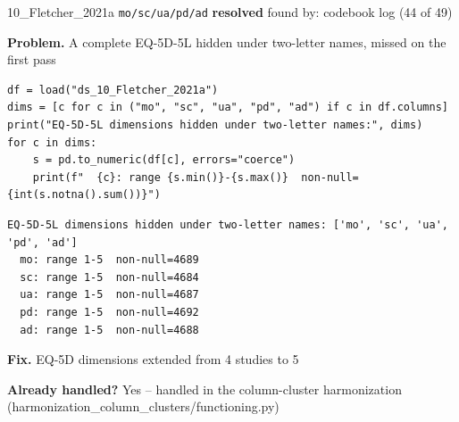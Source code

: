 \documentclass[9pt, t, handout]{beamer}
\newcommand{\ans}[1]{\textcolor{structure.fg}{#1}}
\begin{document}
\begin{frame}[fragile]{10\_Fletcher\_2021a \quad \texttt{mo/sc/ua/pd/ad}}
  {\scriptsize\textcolor{green!45!black}{\textbf{resolved}} \quad
   found by: codebook log \quad (44 of 49)}
  \vspace{3pt}

  {\footnotesize \textbf{Problem.} A complete EQ-5D-5L hidden under two-letter names, missed on the first pass}
  \vspace{4pt}

  \begin{Verbatim}[fontsize=\tiny, frame=single, framesep=2pt, label=\tiny reproduce]
df = load("ds_10_Fletcher_2021a")
dims = [c for c in ("mo", "sc", "ua", "pd", "ad") if c in df.columns]
print("EQ-5D-5L dimensions hidden under two-letter names:", dims)
for c in dims:
    s = pd.to_numeric(df[c], errors="coerce")
    print(f"  {c}: range {s.min()}-{s.max()}  non-null={int(s.notna().sum())}")
  \end{Verbatim}
  \begin{Verbatim}[fontsize=\tiny, frame=single, framesep=2pt, label=\tiny output]
EQ-5D-5L dimensions hidden under two-letter names: ['mo', 'sc', 'ua', 'pd', 'ad']
  mo: range 1-5  non-null=4689
  sc: range 1-5  non-null=4684
  ua: range 1-5  non-null=4687
  pd: range 1-5  non-null=4692
  ad: range 1-5  non-null=4688
  \end{Verbatim}
  \vspace{2pt}

  {\footnotesize \textbf{Fix.} EQ-5D dimensions extended from 4 studies to 5}
  \vspace{2pt}

  {\footnotesize \textbf{Already handled?} \ans{Yes} -- handled in the column-cluster harmonization
   (harmonization\_column\_clusters/functioning.py)}
\end{frame}
\end{document}
